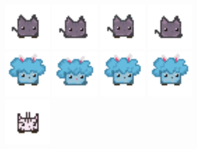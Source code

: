 \documentclass{article}
\begin{document}
\begin{figure}[h]
    \\
    \includegraphics[height = 2cm]{ken/idle_0.png}
    \includegraphics[height = 2cm]{ken/idle_1.png}
    \includegraphics[height = 2cm]{ken/idle_2.png}
    \includegraphics[height = 2cm]{ken/idle_3.png}
    \\
    \includegraphics[height = 2cm]{serge/idle_0.png}
    \includegraphics[height = 2cm]{serge/idle_1.png}
    \includegraphics[height = 2cm]{serge/idle_2.png}
    \includegraphics[height = 2cm]{serge/idle_3.png}
    \\
    \includegraphics[height = 2cm]{zebi/idle_0.png}

\end{figure}
\end{document}
